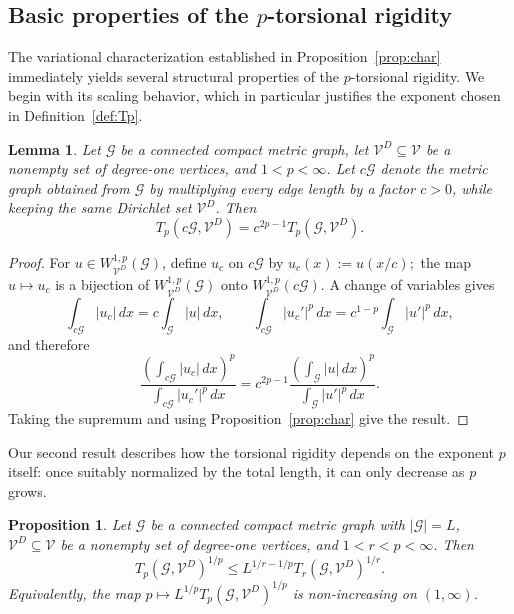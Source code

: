 \documentclass[12pt,a4paper]{article}
\numberwithin{equation}{section}
\newtheorem{proposition}[theorem]{Proposition}
\newtheorem{lemma}[theorem]{Lemma}
\newcommand{\WpD}{W^{1,p}_{\mathcal{V}^D}(\mathcal G)}
\begin{document}
\subsection{Basic properties of the \texorpdfstring{$p$}{p}-torsional rigidity}

The variational characterization established in Proposition~\ref{prop:char}
immediately yields several structural properties of the $p$-torsional
rigidity. We begin with its scaling behavior, which in particular
justifies the exponent chosen in Definition~\ref{def:Tp}.

\begin{lemma}
	\label{lem:scaling}
	Let $\mathcal G$ be a connected compact metric graph, let
	$\mathcal{V}^D\subseteq \mathcal{V}$ be a nonempty set of degree-one vertices, and
	$1<p<\infty$.	Let $c\mathcal G$ denote the metric graph obtained from $\mathcal G$ by
	multiplying every edge length by a factor $c>0$, while keeping the same
	Dirichlet set $\mathcal{V}^D$. Then
	\[
	T_p(c\mathcal G,\mathcal{V}^D)=c^{2p-1}	T_p(\mathcal G,\mathcal{V}^D).
	\]
\end{lemma}

\begin{proof}
	For $u\in\WpD$, define $u_c$ on $c\mathcal G$ by
	\(
	u_c(x):=u(x/c);
	\)
	the map $u\mapsto u_c$ is a bijection of $\WpD$ onto
	$W^{1,p}_{\mathcal V^D}(c\mathcal G)$.
	A change of variables gives
	\[
	\int_{c\mathcal G}|u_c|\,dx
	=
	c\int_{\mathcal G}|u|\,dx,
	\qquad
	\int_{c\mathcal G}|u_c'|^p\,dx
	=
	c^{1-p}\int_{\mathcal G}|u'|^p\,dx,
	\]
	and therefore
	\[
	\frac{\left(\int_{c\mathcal G}|u_c|\,dx\right)^p}
	{\int_{c\mathcal G}|u_c'|^p\,dx}
	=
	c^{2p-1}
	\frac{\left(\int_{\mathcal G}|u|\,dx\right)^p}
	{\int_{\mathcal G}|u'|^p\,dx}.
	\]
	Taking the supremum  and using
	Proposition~\ref{prop:char} give the result.
\end{proof}

Our second result describes how the torsional rigidity depends on the
exponent $p$ itself: once suitably normalized by the total length, it
can only decrease as $p$ grows.

\begin{proposition}
	\label{prop:mono}
	Let $\mathcal G$ be a connected compact metric graph with  $|\mathcal G|=L$,
	$\mathcal{V}^D\subseteq \mathcal{V}$ be a nonempty set of degree-one vertices, and 
	$1<r<p<\infty$. Then
	\[
	T_p(\mathcal G,\mathcal{V}^D)^{1/p}
	\le
	L^{1/r-1/p}
	T_r(\mathcal G,\mathcal{V}^D)^{1/r}.
	\]
	Equivalently, the map
	\(
	p\mapsto
	L^{1/p}	T_p(\mathcal G,\mathcal{V}^D)^{1/p}
	\)
	is non-increasing on $(1,\infty)$.
\end{proposition}
\end{document}
